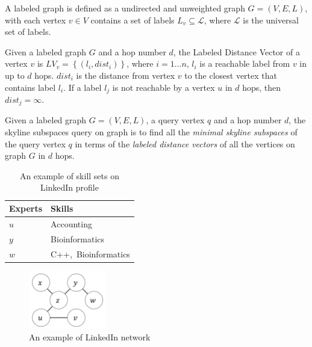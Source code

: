\begin{definition}
A labeled graph is defined as a undirected and unweighted graph $G = (V, E, L)$, with each vertex $v \in V$ contains a set of labels $L_v \subseteq \mathcal{L}$, where $\mathcal{L}$ is the universal set of labels.
\end{definition}

\begin{definition}
Given a labeled graph $G$ and a hop number $d$, the Labeled Distance Vector of a vertex $v$ is $LV_v=\left\{\left(l_i, dist_i\right)\right\}$, where $i = 1 \ldots n$, $l_i$ is a reachable label from $v$ in up to $d$ hops. $dist_i$ is the distance from vertex $v$ to the closest vertex that contains label $l_i$. If a label $l_j$ is not reachable by a vertex $u$ in $d$ hops, then $dist_j = \infty$.
\end{definition}

\begin{definition}
Given a labeled graph $G = (V, E, L)$, a query vertex $q$ and a hop number $d$, the skyline subspaces query on graph is to find all the \emph{minimal skyline subspaces} of the query vertex $q$ in terms of the \emph{labeled distance vectors} of all the vertices on graph $G$ in $d$ hops.
\end{definition}

\begin{table}[h]
    \centering
    \begin{tabular}{|l|l|}
    \hline
    Experts     & Skills \\ \hline
    $u$         & Accounting     \\ \hline
    $y$         & Bioinformatics  \\ \hline
    $w$         & C++,~Bioinformatics \\ \hline
    \end{tabular}
    \caption{\label{tab:skill_sets}An example of skill sets on LinkedIn profile}
\end{table}
    
\begin{figure}[h]
    \centering
    \includegraphics[width=0.3\textwidth]{figs/graph_example}
    \caption{An example of LinkedIn network}
    \label{fig:graph}
\end{figure}

